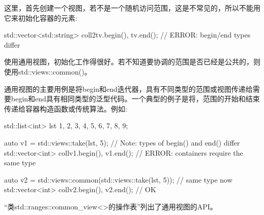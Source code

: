 这里，首先创建一个视图，若不是一个随机访问范围，这是不常见的，所以不能用它来初始化容器的元素:

\begin{cpp}
std::vector<std::string> coll2{tv.begin(), tv.end()}; // ERROR: begin/end types differ
\end{cpp}

使用通用视图，初始化工作得很好。若不知道要协调的范围是否已经是公共的，则使用std::views::common()。

通用视图的主要用例是将begin和end迭代器，具有不同类型的范围或视图传递给需要begin和end具有相同类型的泛型代码。一个典型的例子是将，范围的开始和结束传递给容器构造函数或传统算法。例如:

\begin{cpp}
std::list<int> lst {1, 2, 3, 4, 5, 6, 7, 8, 9};

auto v1 = std::views::take(lst, 5); // Note: types of begin() and end() differ
std::vector<int> coll{v1.begin(), v1.end()}; // ERROR: containers require the same type

auto v2 = std::views::common(std::views::take(lst, 5)); // same type now
std::vector<int> coll{v2.begin(), v2.end()}; // OK
\end{cpp}


“类std::ranges::common\_view<>的操作表”列出了通用视图的API。



